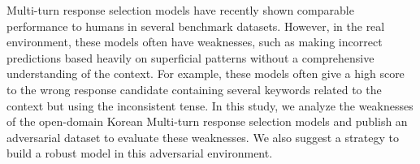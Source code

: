 Multi-turn response selection models have recently shown comparable performance to humans in several benchmark datasets. However, in the real environment, these models often have weaknesses, such as making incorrect predictions based heavily on superficial patterns without a comprehensive understanding of the context. For example, these models often give a high score to the wrong response candidate containing several keywords related to the context but using the inconsistent tense. In this study, we analyze the weaknesses of the open-domain Korean Multi-turn response selection models and publish an adversarial dataset to evaluate these weaknesses. We also suggest a strategy to build a robust model in this adversarial environment.
